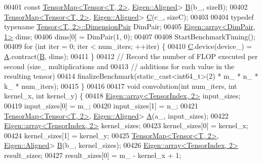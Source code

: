 \begin{DoxyCode}
00401     \textcolor{keyword}{const} \hyperlink{class_eigen_1_1_tensor_map}{TensorMap<Tensor<T, 2>}, \hyperlink{group__enums_gga45fe06e29902b7a2773de05ba27b47a1ad37d4c71425bb286e9b4103830538fbf}{Eigen::Aligned}> 
      \hyperlink{group___core___module_class_eigen_1_1_matrix}{B}(b\_, sizeB);
00402     \hyperlink{class_eigen_1_1_tensor_map}{TensorMap<Tensor<T, 2>}, \hyperlink{group__enums_gga45fe06e29902b7a2773de05ba27b47a1ad37d4c71425bb286e9b4103830538fbf}{Eigen::Aligned}> 
      \hyperlink{group___core___module}{C}(c\_, sizeC);
00403 
00404     \textcolor{keyword}{typedef} \textcolor{keyword}{typename} \hyperlink{class_eigen_1_1_tensor}{Tensor<T, 2>::DimensionPair} DimPair;
00405     \hyperlink{class_eigen_1_1array}{Eigen::array<DimPair, 1>} dims;
00406     dims[0] = DimPair(1, 0);
00407 
00408     StartBenchmarkTiming();
00409     \textcolor{keywordflow}{for} (\textcolor{keywordtype}{int} iter = 0; iter < num\_iters; ++iter) \{
00410       \hyperlink{group___core___module}{C}.device(device\_) = \hyperlink{group___core___module_class_eigen_1_1_matrix}{A}.contract(\hyperlink{group___core___module_class_eigen_1_1_matrix}{B}, dims);
00411     \}
00412     \textcolor{comment}{// Record the number of FLOP executed per second (size\_ multiplications and}
00413     \textcolor{comment}{// additions for each value in the resulting tensor)}
00414     finalizeBenchmark(static\_cast<int64\_t>(2) * m\_ * n\_ * k\_ * num\_iters);
00415   \}
00416 
00417   \textcolor{keywordtype}{void} convolution(\textcolor{keywordtype}{int} num\_iters, \textcolor{keywordtype}{int} kernel\_x, \textcolor{keywordtype}{int} kernel\_y) \{
00418     \hyperlink{class_eigen_1_1array}{Eigen::array<TensorIndex, 2>} input\_sizes;
00419     input\_sizes[0] = m\_;
00420     input\_sizes[1] = n\_;
00421     \hyperlink{class_eigen_1_1_tensor_map}{TensorMap<Tensor<T, 2>}, \hyperlink{group__enums_gga45fe06e29902b7a2773de05ba27b47a1ad37d4c71425bb286e9b4103830538fbf}{Eigen::Aligned}> 
      \hyperlink{group___core___module_class_eigen_1_1_matrix}{A}(a\_, input\_sizes);
00422     \hyperlink{class_eigen_1_1array}{Eigen::array<TensorIndex, 2>} kernel\_sizes;
00423     kernel\_sizes[0] = kernel\_x;
00424     kernel\_sizes[1] = kernel\_y;
00425     \hyperlink{class_eigen_1_1_tensor_map}{TensorMap<Tensor<T, 2>}, \hyperlink{group__enums_gga45fe06e29902b7a2773de05ba27b47a1ad37d4c71425bb286e9b4103830538fbf}{Eigen::Aligned}> 
      \hyperlink{group___core___module_class_eigen_1_1_matrix}{B}(b\_, kernel\_sizes);
00426     \hyperlink{class_eigen_1_1array}{Eigen::array<TensorIndex, 2>} result\_sizes;
00427     result\_sizes[0] = m\_ - kernel\_x + 1;

\end{DoxyCode}
